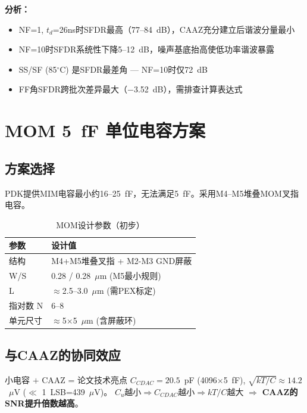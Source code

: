 \documentclass[11pt,a4paper,UTF8]{ctexart}
\begin{document}
\textbf{分析：}
\begin{itemize}
  \item NF=1, $t_d$=26ns时SFDR最高（77--84~dB），CAAZ充分建立后谐波分量最小
  \item NF=10时SFDR系统性下降5--12~dB，噪声基底抬高使低功率谐波暴露
  \item SS/SF (85$^\circ$C) 是SFDR最差角 --- NF=10时仅72~dB
  \item FF角SFDR跨批次差异最大（$-$3.52~dB），需排查计算表达式
\end{itemize}

\section{MOM 5~fF 单位电容方案}
\label{sec:mom}

\subsection{方案选择}

PDK提供MIM电容最小约16--25~fF，无法满足5~fF。采用M4--M5堆叠MOM叉指电容。

\begin{table}[htbp]
\centering
\caption{MOM设计参数（初步）}
\label{tab:mom-params}
\begin{tabular}{ll}
\toprule
\textbf{参数} & \textbf{设计值} \\
\midrule
结构 & M4+M5堆叠叉指 + M2-M3 GND屏蔽 \\
W/S & 0.28 / 0.28~$\mu$m (M5最小规则) \\
L & $\approx$2.5--3.0~$\mu$m (需PEX标定) \\
指对数 N & 6--8 \\
单元尺寸 & $\approx$5$\times$5~$\mu$m (含屏蔽环) \\
\bottomrule
\end{tabular}
\end{table}

\subsection{与CAAZ的协同效应}

\begin{resultbox}{小电容 $+$ CAAZ = 论文技术亮点}
$C_{CDAC}=20.5$~pF (4096$\times$5~fF), $\sqrt{kT/C}\approx14.2$~$\mu$V ($\ll$ 1~LSB=439~$\mu$V)。
$C_u$越小$\Rightarrow C_{CDAC}$越小$\Rightarrow kT/C$越大 $\Rightarrow$ \textbf{CAAZ的SNR提升倍数越高}。
\end{resultbox}
\end{document}
